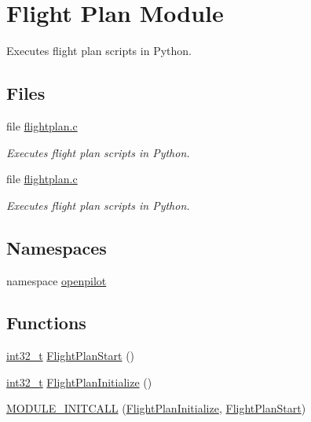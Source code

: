 \hypertarget{group___flight_plan}{\section{Flight Plan Module}
\label{group___flight_plan}
}


Executes flight plan scripts in Python.  


\subsection*{Files}
\begin{DoxyCompactItemize}
\item 
file \hyperlink{flightplan_8c}{flightplan.\-c}
\begin{DoxyCompactList}\small\item\em Executes flight plan scripts in Python. \end{DoxyCompactList}\item 
file \hyperlink{flightplan_8c}{flightplan.\-c}
\begin{DoxyCompactList}\small\item\em Executes flight plan scripts in Python. \end{DoxyCompactList}\end{DoxyCompactItemize}
\subsection*{Namespaces}
\begin{DoxyCompactItemize}
\item 
namespace \hyperlink{namespaceopenpilot}{openpilot}
\end{DoxyCompactItemize}
\subsection*{Functions}
\begin{DoxyCompactItemize}
\item 
\hyperlink{group___n_a_m_e_gafd12020da5a235dfcf0c3c748fb5baed}{int32\-\_\-t} \hyperlink{group___flight_plan_ga9e81f8d46e27e303b5f687f858968ab3}{Flight\-Plan\-Start} ()
\item 
\hyperlink{group___n_a_m_e_gafd12020da5a235dfcf0c3c748fb5baed}{int32\-\_\-t} \hyperlink{group___flight_plan_gaceb66846922085678d2302b11f36d40d}{Flight\-Plan\-Initialize} ()
\item 
\hyperlink{group___flight_plan_ga2eb464f8541c96fded6af57aa0e7bcab}{M\-O\-D\-U\-L\-E\-\_\-\-I\-N\-I\-T\-C\-A\-L\-L} (\hyperlink{group___flight_plan_gaceb66846922085678d2302b11f36d40d}{Flight\-Plan\-Initialize}, \hyperlink{group___flight_plan_ga9e81f8d46e27e303b5f687f858968ab3}{Flight\-Plan\-Start})
\end{DoxyCompactItemize}

